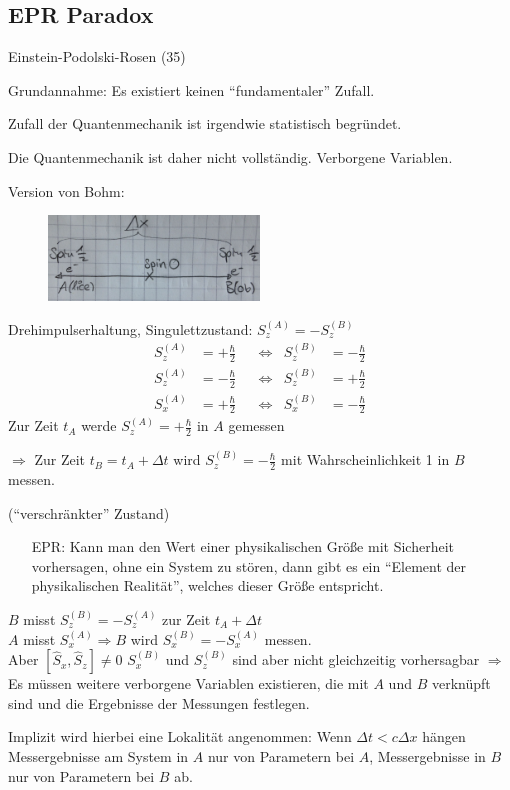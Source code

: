 \subsection{EPR Paradox}
	Einstein-Podolski-Rosen (35)
	
	Grundannahme: Es existiert keinen ``fundamentaler'' Zufall.
	
	Zufall der Quantenmechanik ist irgendwie statistisch begründet.
	
	Die Quantenmechanik ist daher nicht vollständig. Verborgene Variablen.
	
	Version von Bohm:
	\begin{figure} [h]
		\begin{center}
			\includegraphics[width = 0.5\textwidth]{EPR_Paradox}
		\end{center}
	\end{figure}

	Drehimpulserhaltung, Singulettzustand: $S_z^{(A)} = -S_z^{(B)}$
		\begin{align*} 
			S_{z}^{(A)} &= + \frac{\hbar}{2} &
			&\Leftrightarrow &S_z^{(B)} &= -\frac{\hbar}{2} \\
			S_z^{(A)} &= -\frac{\hbar}{2}& &\Leftrightarrow &S_z^{(B)} &= + \frac{\hbar}{2} \\
			S_x^{(A)} &= + \frac{\hbar}{2}& &\Leftrightarrow &S_x^{(B)} &= - \frac{\hbar}{2} 
		\end{align*}
	Zur Zeit $t_A$ werde $S_z^{(A)} = + \frac{\hbar}{2}$ in $A$ gemessen
	
	$\Rightarrow$ Zur Zeit $t_B = t_A + \Delta t$ wird $S_z^{(B)} = -\frac{\hbar}{2}$ mit Wahrscheinlichkeit 1 in $B$  messen.
	
	(``verschränkter'' Zustand)
	
	\begin{itemize}
		\item[EPR:] Kann man den Wert einer physikalischen Größe mit Sicherheit vorhersagen, ohne ein System zu stören, dann gibt es ein ``Element der physikalischen Realität'', welches dieser Größe entspricht.
	\end{itemize}
	$B$ misst $S_z^{(B)} = -S_z^{(A)}$ zur Zeit $t_A + \Delta t$ 
	\\
	$A$ misst $S_x^{(A)} \Rightarrow B$ wird $S_x^{(B)} = -S_x^{(A)}$ messen.
	\\
	Aber $[\hat{S}_x , \hat{S}_z] \neq 0$ $S_x^{(B)}$ und $S_z^{(B)}$ sind aber nicht gleichzeitig vorhersagbar $\Rightarrow$ Es müssen weitere verborgene Variablen existieren, die mit $A$ und $B$ verknüpft sind und die Ergebnisse der Messungen festlegen.
	
	Implizit wird hierbei eine Lokalität angenommen: Wenn $\Delta t < c \Delta x$ hängen Messergebnisse am System in $A$ nur von Parametern bei $A$, Messergebnisse in $B$ nur von Parametern bei $B$ ab.